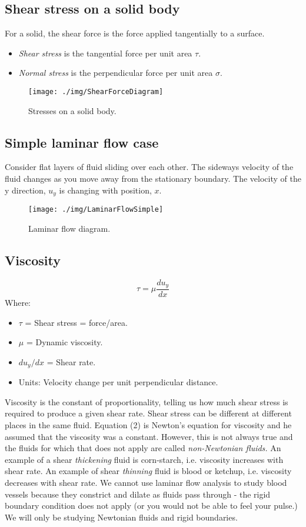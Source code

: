 \subsection{Shear stress on a solid body}
For a solid, the shear force is the force applied tangentially to a surface.
\begin{itemize}
  \item \emph{Shear stress} is the tangential force per unit area \( \tau\).
  \item \emph{Normal stress} is the perpendicular force per unit area \( \sigma \).
\end{itemize}
\begin{figure}[h!]
  \centering
  \texttt{[image: ./img/ShearForceDiagram]}
  \caption{Stresses on a solid body.}
\end{figure}
\subsection{Simple laminar flow case}
Consider flat layers of fluid sliding over each other. The sideways velocity of the fluid changes as you move away from the stationary boundary. The velocity of the y direction, \( u_y \) is changing with position, \( x\).
\begin{figure}[h!]
  \centering
  \texttt{[image: ./img/LaminarFlowSimple]}
  \caption{Laminar flow diagram.}
\end{figure}
\subsection{Viscosity}
\begin{equation}
  \tau = \mu \frac{du_y}{dx}
\end{equation}
Where:
\begin{itemize}[noitemsep]
  \item \(\tau \) = Shear stress = force/area.
  \item \(\mu \) = Dynamic viscosity.
  \item \( du_y / dx \) = Shear rate.
  \item Units: Velocity change per unit perpendicular distance.
\end{itemize}
Viscosity is the constant of proportionality, telling us how much shear stress is required to produce a given shear rate. Shear stress can be different at different places in the same fluid. Equation (2) is Newton's equation for viscosity and he assumed that the viscosity was a constant. However, this is not always true and the fluids for which that does not apply are called \emph{non-Newtonian fluids.} An example of a shear \emph{thickening} fluid is corn-starch, i.e. viscosity increases with shear rate. An example of shear \emph{thinning} fluid is blood or ketchup, i.e. viscosity decreases with shear rate. We cannot use laminar flow analysis to study blood vessels because they constrict and dilate as fluids pass through - the rigid boundary condition does not apply (or you would not be able to feel your pulse.) We will only be studying Newtonian fluids and rigid boundaries.

